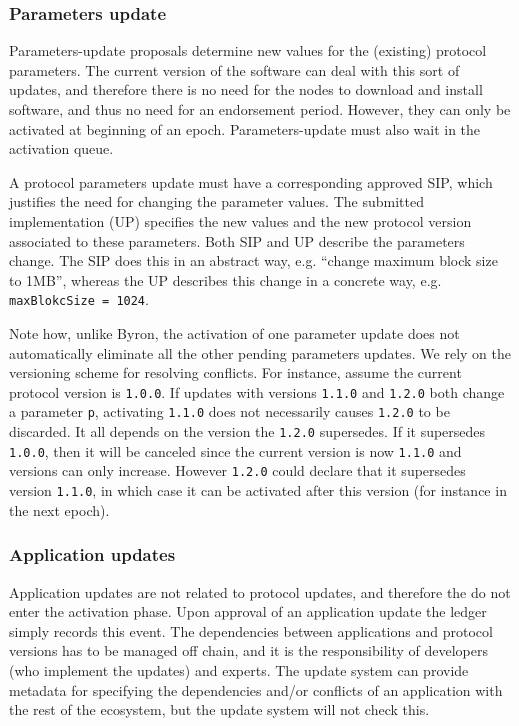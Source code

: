 \subsubsection{Parameters update}
\label{sec:parameters-update}

Parameters-update proposals determine new values for the (existing) protocol
parameters. The current version of the software can deal with this sort of
updates, and therefore there is no need for the nodes to download and install
software, and thus no need for an endorsement period. However, they can only be
activated at beginning of an epoch. Parameters-update must also wait in the
activation queue.

A protocol parameters update must have a corresponding approved SIP, which
justifies the need for changing the parameter values. The submitted
implementation (UP) specifies the new values and the new protocol version
associated to these parameters. Both SIP and UP describe the parameters change.
The SIP does this in an abstract way, e.g. ``change maximum block size to 1MB'',
whereas the UP describes this change in a concrete way, e.g.
\texttt{maxBlokcSize = 1024}.

Note how, unlike Byron, the activation of one parameter update does not
automatically eliminate all the other pending parameters updates. We rely on the
versioning scheme for resolving conflicts. For instance, assume the current
protocol version is \texttt{1.0.0}. If updates with versions \texttt{1.1.0} and
\texttt{1.2.0} both change a parameter \texttt{p}, activating \texttt{1.1.0}
does not necessarily causes \texttt{1.2.0} to be discarded. It all depends on
the version the \texttt{1.2.0} supersedes. If it supersedes \texttt{1.0.0}, then
it will be canceled since the current version is now \texttt{1.1.0} and versions
can only increase. However \texttt{1.2.0} could declare that it supersedes
version \texttt{1.1.0}, in which case it can be activated after this version
(for instance in the next epoch).

\subsubsection{Application updates}
\label{sec:software-only-updates}

Application updates are not related to protocol updates, and therefore the do
not enter the activation phase.
%
Upon approval of an application update the ledger simply records this event.
%
The dependencies between applications and protocol versions has to be managed
off chain, and it is the responsibility of developers (who implement the
updates) and experts. The update system can provide metadata for specifying the
dependencies and/or conflicts of an application with the rest of the ecosystem,
but the update system will not check this.

